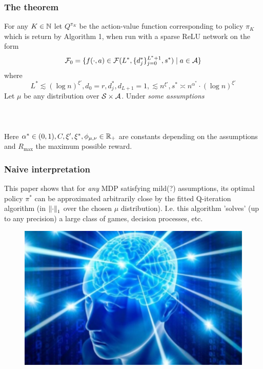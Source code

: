 \documentclass{beamer}
\begin{document}
\begin{frame}
	\frametitle{The theorem}
	For any $K \in \mathbb{N}$ let $Q^{\pi_K}$ be the action-value function
	corresponding to policy $\pi_K$ which is return by Algorithm 1,
	when run with a sparse ReLU network on the form
	\[ \mathcal{F}_0 = \{f(\cdot, a) \in \mathcal{F}(L^*, \{d_j^*\}_{j=0}^{L^*+1},s^*)
		\mid a \in \mathcal{A} \} \]
	where
	\[ L^* \lesssim (\log n)^{\xi'}, d_0 = r, d_j^*, d_{L+1}=1, \lesssim n^{\xi'},
		s^* \asymp n^{\alpha^*} \cdot (\log n)^{\xi'} \]
	Let $\mu$ be any distribution over $\mathcal{S} \times \mathcal{A}$.
	Under \emph{some assumptions} 
	\\~\\
	\\~\\
	Here $\alpha^* \in (0,1), C, \xi', \xi^*, \phi_{\mu,\nu} \in \mathbb{R}_{+}$
	are constants depending on the assumptions
	and $R_{\max}$ the maximum possible reward.
\end{frame}

\begin{frame}
	\frametitle{Naive interpretation}
	This paper shows that for \emph{any} MDP satisfying mild(?) assumptions,
	its optimal policy $\pi^*$ can be approximated arbitrarily close by
	the fitted Q-iteration algorithm
	(in $\left\lVert\cdot\right\rVert_1$ over the chosen $\mu$ distribution).
	I.e. this algorithm 'solves' (up to any precision)
	a large class of games, decision processes, etc.
	\begin{figure}
		\centering
		\includegraphics[scale=0.5]{Brain.jpg}
	\end{figure}
\end{frame}
\end{document}
